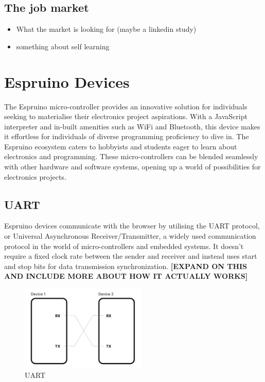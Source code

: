 \documentclass{l4proj}
\begin{document}
\subsection{The job market}
\begin{itemize}
    \item What the market is looking for (maybe a linkedin study)
    \item something about self learning
\end{itemize}

\section{Espruino Devices}
\text 
The Espruino micro-controller provides an innovative solution for individuals seeking to materialise their electronics project aspirations. With a JavaScript interpreter and in-built amenities such as WiFi and Bluetooth, this device makes it effortless for individuals of diverse programming proficiency to dive in. The Espruino ecosystem caters to hobbyists and students eager to learn about electronics and programming. These micro-controllers can be blended seamlessly with other hardware and software systems, opening up a world of possibilities for electronics projects.

    
\subsection{UART}
\text Espruino devices communicate with the browser by utilising the UART protocol, or Universal Asynchronous Receiver/Transmitter, a widely used communication protocol in the world of micro-controllers and embedded systems. It doesn't require a fixed clock rate between the sender and receiver and instead uses start and stop bits for data transmission synchronization. \textbf{[EXPAND ON THIS AND INCLUDE MORE ABOUT HOW IT ACTUALLY WORKS]}


\begin{figure}[!ht]
\begin{center}
    \includegraphics[width=60mm,scale=0.5]{dissertation/images/UART_diagram.png}
\end{center}
\caption{UART}
    \label{fig:UART}
\end{figure}
\end{document}
